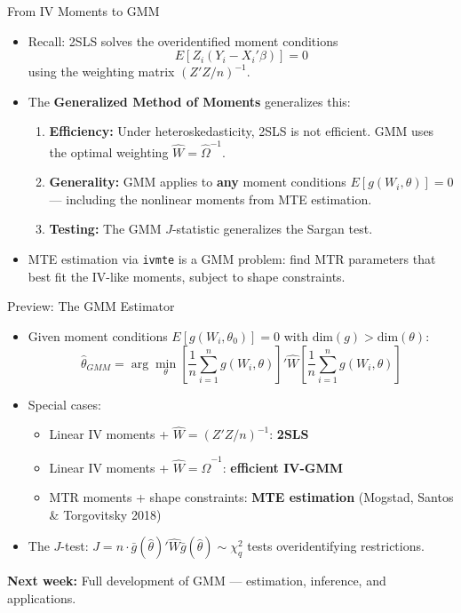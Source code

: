 \documentclass[aspectratio=169, handout]{beamer}
\numberwithin{equation}{section}
\begin{document}
\begin{frame}{From IV Moments to GMM}
\begin{itemize}
\item Recall: 2SLS solves the overidentified moment conditions
$$E[Z_i(Y_i-X_i'\beta)]=0$$
using the weighting matrix $(Z'Z/n)^{-1}$.
\item The \textbf{Generalized Method of Moments} generalizes this:
\begin{enumerate}
\item \textbf{Efficiency:} Under heteroskedasticity, 2SLS is not efficient.  GMM uses the optimal weighting $\hat{W}=\hat{\Omega}^{-1}$.
\item \textbf{Generality:} GMM applies to \textbf{any} moment conditions $E[g(W_i,\theta)]=0$ --- including the nonlinear moments from MTE estimation.
\item \textbf{Testing:} The GMM $J$-statistic generalizes the Sargan test.
\end{enumerate}
\item MTE estimation via \texttt{ivmte} is a GMM problem: find MTR parameters that best fit the IV-like moments, subject to shape constraints.
\end{itemize}
\end{frame}


\begin{frame}{Preview: The GMM Estimator}
\begin{itemize}
\item Given moment conditions $E[g(W_i,\theta_0)]=0$ with $\text{dim}(g)>\text{dim}(\theta)$:
$$\hat{\theta}_{GMM}=\arg\min_\theta \left[\frac{1}{n}\sum_{i=1}^n g(W_i,\theta)\right]'\hat{W}\left[\frac{1}{n}\sum_{i=1}^n g(W_i,\theta)\right]$$
\item Special cases:
\begin{itemize}
\item Linear IV moments + $\hat{W}=(Z'Z/n)^{-1}$: \textbf{2SLS}
\item Linear IV moments + $\hat{W}=\hat{\Omega}^{-1}$: \textbf{efficient IV-GMM}
\item MTR moments + shape constraints: \textbf{MTE estimation} (Mogstad, Santos \& Torgovitsky 2018)
\end{itemize}
\item The $J$-test: $J = n\cdot\bar{g}(\hat{\theta})'\hat{W}\bar{g}(\hat{\theta})\sim\chi^2_q$ tests overidentifying restrictions.
\end{itemize}
\begin{tcolorbox}[colback=blue!5, colframe=blue!50]
\textbf{Next week:} Full development of GMM --- estimation, inference, and applications.
\end{tcolorbox}
\end{frame}
\end{document}
